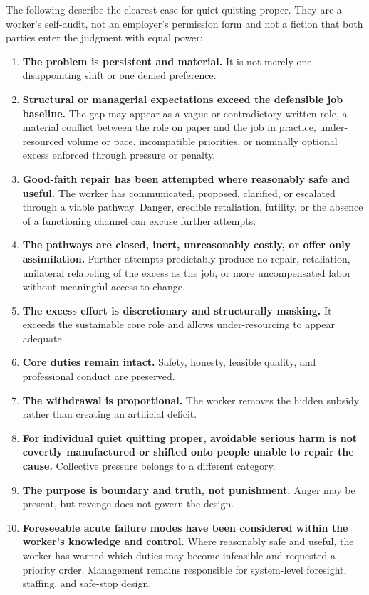 \documentclass[11pt,oneside]{article}
\providecommand{\tightlist}{%
  \setlength{\itemsep}{0.22em}\setlength{\parskip}{0pt}}
\begin{document}
The following describe the clearest case for quiet quitting proper. They
are a worker's self-audit, not an employer's permission form and not a
fiction that both parties enter the judgment with equal power:

\begin{enumerate}
\def\labelenumi{\arabic{enumi}.}
\tightlist
\item
  \textbf{The problem is persistent and material.} It is not merely one
  disappointing shift or one denied preference.
\item
  \textbf{Structural or managerial expectations exceed the defensible
  job baseline.} The gap may appear as a vague or contradictory written
  role, a material conflict between the role on paper and the job in
  practice, under-resourced volume or pace, incompatible priorities, or
  nominally optional excess enforced through pressure or penalty.
\item
  \textbf{Good-faith repair has been attempted where reasonably safe and
  useful.} The worker has communicated, proposed, clarified, or
  escalated through a viable pathway. Danger, credible retaliation,
  futility, or the absence of a functioning channel can excuse further
  attempts.
\item
  \textbf{The pathways are closed, inert, unreasonably costly, or offer
  only assimilation.} Further attempts predictably produce no repair,
  retaliation, unilateral relabeling of the excess as the job, or more
  uncompensated labor without meaningful access to change.
\item
  \textbf{The excess effort is discretionary and structurally masking.}
  It exceeds the sustainable core role and allows under-resourcing to
  appear adequate.
\item
  \textbf{Core duties remain intact.} Safety, honesty, feasible quality,
  and professional conduct are preserved.
\item
  \textbf{The withdrawal is proportional.} The worker removes the hidden
  subsidy rather than creating an artificial deficit.
\item
  \textbf{For individual quiet quitting proper, avoidable serious harm
  is not covertly manufactured or shifted onto people unable to repair
  the cause.} Collective pressure belongs to a different category.
\item
  \textbf{The purpose is boundary and truth, not punishment.} Anger may
  be present, but revenge does not govern the design.
\item
  \textbf{Foreseeable acute failure modes have been considered within
  the worker's knowledge and control.} Where reasonably safe and useful,
  the worker has warned which duties may become infeasible and requested
  a priority order. Management remains responsible for system-level
  foresight, staffing, and safe-stop design.
\end{enumerate}
\end{document}
